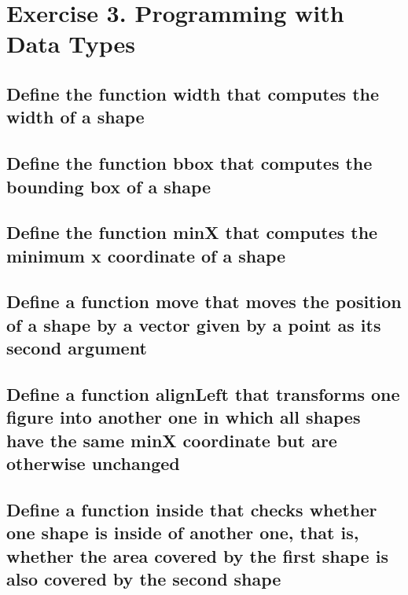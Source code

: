 \section{Exercise 3. Programming with Data Types}

\subsection{Define the function width that computes the width of a shape}



\subsection{Define the function bbox that computes the bounding box of a shape}



\subsection{Define the function minX that computes the minimum x coordinate of a shape}



\subsection{Define a function move that moves the position of a shape by a vector given by a point as its second argument}



\subsection{Define a function alignLeft that transforms one figure into another one in which all shapes have the same minX coordinate but are otherwise unchanged}



\subsection{Define a function inside that checks whether one shape is inside of another one, that is, whether the area covered by the first shape is also covered by the second shape}

